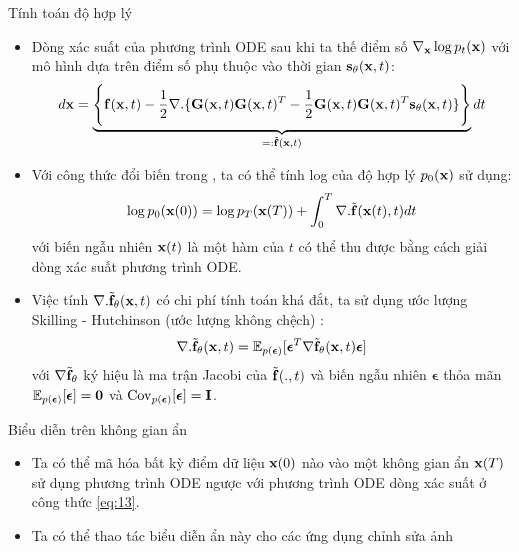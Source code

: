 \documentclass[10pt]{beamer}
\theoremstyle{remark}
\numberwithin{algocf}{section}
\numberwithin{equation}{section}
\numberwithin{dl}{section}
\numberwithin{figure}{section}
\begin{document}
\begin{frame}[shrink]{Tính toán độ hợp lý}
	\begin{itemize}
		\item Dòng xác suất của phương trình ODE sau khi ta thế điểm số $\nabla_{\bold{x}} \log p_t (\bold{x})$ với mô hình dựa trên điểm số phụ thuộc vào thời gian $\bold{s}_{\bold{\theta}}(\bold{x}, t)$:
		\begin{equation} \label{eq:38}
			d \bold{x} = \underbrace{\Bigg \lbrace \bold{f}(\bold{x}, t) - \dfrac{1}{2} \nabla . \lbrace \bold{G}(\bold{x}, t) \bold{G}(\bold{x}, t)^T - \dfrac{1}{2} \bold{G}(\bold{x}, t) \bold{G}(\bold{x}, t)^T \bold{s}_{\bold{\theta}} (\bold{x}, t) \rbrace \Bigg \rbrace}_{=: \tilde{\bold{f}}(\bold{x}, t)} dt
		\end{equation}
		\item Với công thức đổi biến trong \citep{chen2018neural}, ta có thể tính log của độ hợp lý $p_0 (\bold{x})$ sử dụng:
		\begin{equation} \label{eq:39}
			\log p_0 (\bold{x}(0)) = \log p_T (\bold{x}(T)) + \int_{0}^{T} \nabla . \tilde{\bold{f}}(\bold{x}(t), t) dt
		\end{equation}
		với biến ngẫu nhiên $\bold{x}(t)$ là một hàm của $t$ có thể thu được bằng cách giải dòng xác suất phương trình ODE.
		\item Việc tính $\nabla . \tilde{\bold{f}}_{\bold{\theta}}(\bold{x}, t)$ có chi phí tính toán khá đắt, ta sử dụng ước lượng Skilling - Hutchinson  (ước lượng không chệch) \citep{skilling1989eigenvalues,hutchinson1989stochastic}:
		\begin{equation} \label{eq:40}
			\nabla . \tilde{\bold{f}}_{\bold{\theta}}(\bold{x}, t) = \mathbb{E}_{p(\boldsymbol{\epsilon})} \lbrack \boldsymbol{\epsilon}^T \nabla \tilde{\bold{f}}_{\bold{\theta}} (\bold{x}, t) \boldsymbol{\epsilon} \rbrack
		\end{equation}
		với $\nabla \tilde{\bold{f}}_{\bold{\theta}}$ ký hiệu là ma trận Jacobi của $\tilde{\bold{f}}(., t)$ và biến ngẫu nhiên $\boldsymbol{\epsilon}$ thỏa mãn $\mathbb{E}_{p(\boldsymbol{\epsilon})} \lbrack \boldsymbol{\epsilon} \rbrack = \bold{0}$ và $\mathrm{Cov}_{p(\boldsymbol{\epsilon})} \lbrack \boldsymbol{\epsilon} \rbrack = \bold{I}$.
	\end{itemize}
\end{frame}

\begin{frame}{Biểu diễn trên không gian ẩn}
	\begin{itemize}
		\item Ta có thể mã hóa bất kỳ điểm dữ liệu $\bold{x}(0)$ nào vào một không gian ẩn $\bold{x}(T)$ sử dụng phương trình ODE ngược với phương trình ODE dòng xác suất ở công thức \ref{eq:13}.
		\item Ta có thể thao tác biểu diễn ẩn này cho các ứng dụng chỉnh sửa ảnh
	\end{itemize}
\end{frame}
\end{document}
